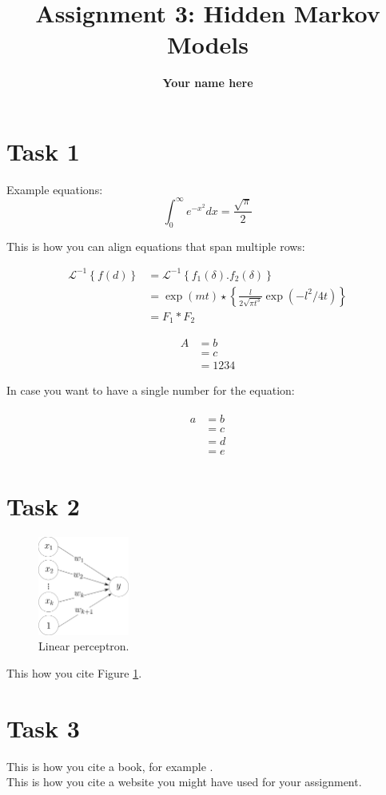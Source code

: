 \documentclass[11pt]{article}
\title{Assignment 3: Hidden Markov Models}
\author{\textbf{Your name here}}
\date{}
\begin{document}
\maketitle
\section{Task 1}

Example equations: 
\begin{equation}
\int_0^\infty e^{-x^2} dx=\frac{\sqrt{\pi}}{2}    
\end{equation}

This is how you can align equations that span multiple rows:

\begin{align}
\mathcal{L}^{-1}\left\{f(d)\right\} &= \mathcal{L}^{-1}\left\{f_1(\delta).f_2(\delta)\right\} \\
& = \exp(mt) \star \left\{\frac{l}{2\sqrt{\pi t^3}} \exp(-l^2/{4t})\right\} \\
& = F_1 * F_2
\end{align}

\begin{align}
A &= b \\
& = c \\
& = 1234
\end{align}

In case you want to have a single number for the equation:

\begin{align}
\begin{split}
  a &= b \\
  &=c \\
  &=d \\
  &=e
\end{split}
\end{align}

\section{Task 2}

\begin{figure}[!htb]
    \centering
    \includegraphics[width=3cm]{Perceptron.png}
    \caption{Linear perceptron.}
    \label{fig:my_label}
\end{figure}

This how you cite Figure \ref{fig:my_label}.

\section{Task 3}
This is how you cite a book, for example \cite{Bishop:2006:PRM:1162264}.\\
This is how you cite a website \cite{quoraSVM} you might have used for your assignment.



\end{document}
